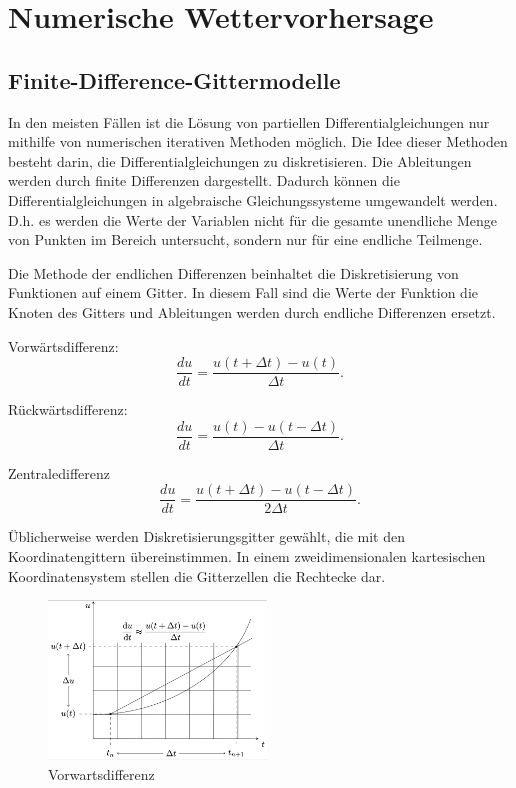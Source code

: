 %
%
%
%
\section{Numerische Wettervorhersage
\label{spektral:section:nwp}}

\subsection{Finite-Difference-Gittermodelle
\label{spektral:subsection:gittermodelle}}
In den meisten Fällen ist die Lösung von partiellen Differentialgleichungen nur mithilfe von numerischen iterativen Methoden möglich. 
Die Idee dieser Methoden besteht darin, die Differentialgleichungen zu diskretisieren.
Die Ableitungen werden durch finite Differenzen dargestellt.
Dadurch können die Differentialgleichungen in algebraische Gleichungssysteme umgewandelt werden.
D.h. es werden die Werte der Variablen nicht für die gesamte unendliche Menge von Punkten im Bereich untersucht, sondern nur für eine endliche Teilmenge.

Die Methode der endlichen Differenzen beinhaltet die Diskretisierung von Funktionen auf einem Gitter.
In diesem Fall sind die Werte der Funktion die Knoten des Gitters und Ableitungen werden durch endliche Differenzen ersetzt.

Vorwärtsdifferenz:
\begin{equation}
\frac{du}{dt} = \frac{u(t + \Delta{t}) - u(t)}{\Delta{t}}.
\label{spektral:equation1}
\end{equation}

Rückwärtsdifferenz:
\begin{equation}
\frac{du}{dt} = \frac{u(t) - u(t - \Delta{t})}{\Delta{t}}.
\label{spektral:equation2}
\end{equation}

Zentraledifferenz
\begin{equation}
\frac{du}{dt} = \frac{u(t + \Delta{t}) - u(t - \Delta{t})}{2\Delta{t}}.
\label{spektral:equation3}
\end{equation}

Üblicherweise werden Diskretisierungsgitter gewählt, die mit den Koordinatengittern übereinstimmen.
In einem zweidimensionalen kartesischen Koordinatensystem stellen die Gitterzellen die Rechtecke dar.
\pagebreak
\begin{figure}[h]
	\centering
	\includegraphics[height=120pt]{papers/spektral/images/forwarddiff.png}
	\caption{Vorwartsdifferenz}
    \label{spektral:fig:gittermodelle}
\end{figure}

